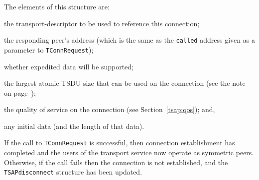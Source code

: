 The elements of this structure are:
\begin{describe}
\item[\verb"tc\_sd":] the transport-descriptor to be used to reference this
connection;

\item[\verb"tc\_responding":]	the responding peer's address
(which is the same as the \verb"called" address given as a parameter to
\verb"TConnRequest");

\item[\verb"tc\_expedited":]	whether expedited data will be supported;

\item[\verb"tc\_tsdusize":]	the largest atomic TSDU size that can be used
on the connection (see the note on page~\pageref{TSDU:atomic});

\item[\verb"tc\_qos":] the quality of service on the connection
(see Section~\ref{tsap:qos});
and,

\item[\verb"tc\_data"/\verb"tc\_cc":] any initial data
(and the length of that data).
\end{describe}
If the call to \verb"TConnRequest" is successful,
then connection establishment has completed
and the users of the transport service now operate as symmetric peers.
Otherwise, if the call fails then the connection is not established,
and the \verb"TSAPdisconnect" structure has been updated.

